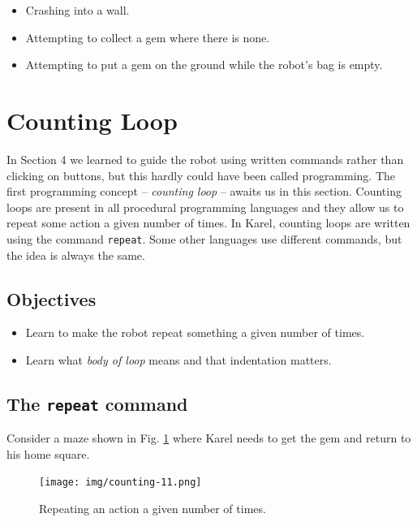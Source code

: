 \begin{itemize}
\item Crashing into a wall.
\item Attempting to collect a gem where there is none.
\item Attempting to put a gem on the ground while the robot's bag is empty.
\end{itemize}


\section{Counting Loop} \label{sec:repeat}

In Section 4 we learned to guide the robot using written commands rather than 
clicking on buttons, but this hardly could have been called programming. 
The first programming concept -- {\em counting loop} -- awaits us in this 
section. Counting loops are present in all procedural programming languages 
and they allow us to repeat some action a given number of times. In Karel, 
counting loops are written using the command {\tt repeat}. Some other languages 
use different commands, but the idea is always the same.

\subsection{Objectives} 

\begin{itemize}
\item Learn to make the robot repeat something a given number of times.
\item Learn what {\em body of loop} means and that indentation matters.
\end{itemize}

\subsection{The {\tt repeat} command}

Consider a maze shown in Fig. \ref{fig:counting-11} where Karel needs to 
get the gem and return to his home square. 

\begin{figure}[!ht]
\begin{center}
\texttt{[image: img/counting-11.png]}
\vspace{-0mm}
\caption{Repeating an action a given number of times.}
\label{fig:counting-11}
\end{center}
\end{figure}

